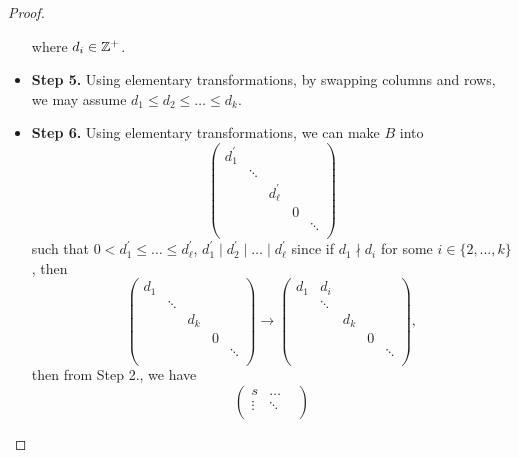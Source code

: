 \begin{proof}
\begin{itemize}
\[		      \]
		      where \(d_{i} \in \mathbb{\MakeUppercase{z}} ^+\).
		\item \textbf{Step 5.} Using elementary transformations, by swapping columns and rows, we may assume \(d_1 \leq d_2 \leq \ldots \leq  d_{k}  \).
		\item \textbf{Step 6.} Using elementary transformations, we can make \(B\) into
		      \[
			      \begin{pmatrix}
				      d_1^\prime &        &                  &   &        \\
				                 & \ddots &                  &   &        \\
				                 &        & d_{\ell }^\prime &   &        \\
				                 &        &                  & 0 &        \\
				                 &        &                  &   & \ddots \\
			      \end{pmatrix}
		      \]
		      such that \(0< d_1^\prime \leq \ldots \leq d_{\ell }^\prime\), \(d_1^\prime \mid d_2^\prime \mid \ldots \mid d_{\ell }^\prime\) since if \(d_1\nmid d_{i} \) for some \(i\in \{2, \ldots , k \}\), then
		      \[
			      \begin{pmatrix}
				      d_1 &        &       &   &        \\
				          & \ddots &       &   &        \\
				          &        & d_{k} &   &        \\
				          &        &       & 0 &        \\
				          &        &       &   & \ddots \\
			      \end{pmatrix}\to \begin{pmatrix}
				      d_1 & d_{i}  &       &   &        \\
				          & \ddots &       &   &        \\
				          &        & d_{k} &   &        \\
				          &        &       & 0 &        \\
				          &        &       &   & \ddots \\
			      \end{pmatrix},
		      \]
		      then from Step 2., we have
		      \[
			      \begin{pmatrix}
				      s      & \ldots & \\
				      \vdots & \ddots   \\

\end{pmatrix}\]
\end{itemize}
\end{proof}
